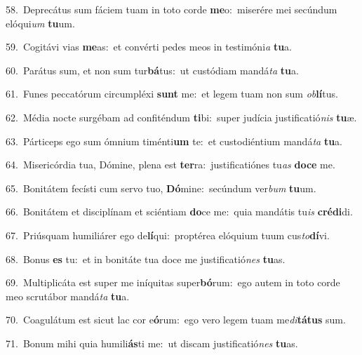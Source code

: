 {\numbfont\textcolor{\numbcolor}{58.}}~Deprecátus sum fáciem tuam in toto corde \textbf{me}\-o:~\star miserére mei secúndum elóqui\textit{um} \textbf{tu}\-um.\par
{\numbfont\textcolor{\numbcolor}{59.}}~Cogitávi vias \textbf{me}\-as:~\star et convérti pedes meos in testimóni\textit{a} \textbf{tu}\-a.\par
{\numbfont\textcolor{\numbcolor}{60.}}~Parátus sum, et non sum tur\-\textbf{bá}\-tus:~\star ut custódiam mandá\textit{ta} \textbf{tu}\-a.\par
{\numbfont\textcolor{\numbcolor}{61.}}~Funes peccatórum circumpléxi \textbf{sunt} me:~\star et legem tuam non sum \textit{ob}\-\textbf{lí}tus.\par
{\numbfont\textcolor{\numbcolor}{62.}}~Média nocte surgébam ad confiténdum \textbf{ti}\-bi:~\star super judícia justificatió\textit{nis} \textbf{tu}\-æ.\par
{\numbfont\textcolor{\numbcolor}{63.}}~Párticeps ego sum ómnium timénti\textbf{um} te:~\star et custodiéntium mandá\textit{ta} \textbf{tu}\-a.\par
{\numbfont\textcolor{\numbcolor}{64.}}~Misericórdia tua, Dómine, plena est \textbf{ter}\-ra:~\star justificatiónes tu\textit{as} \textbf{do}\-\textbf{ce} me.\par
{\numbfont\textcolor{\numbcolor}{65.}}~Bonitátem fecísti cum servo tuo, \textbf{Dó}\-mine:~\star secúndum ver\textit{bum} \textbf{tu}\-um.\par
{\numbfont\textcolor{\numbcolor}{66.}}~Bonitátem et disciplínam et sciéntiam \textbf{do}\-ce me:~\star quia mandátis tu\textit{is} \textbf{cré}\-\textbf{di}di.\par
{\numbfont\textcolor{\numbcolor}{67.}}~Priúsquam humiliárer ego de\-\textbf{lí}\-qui:~\star proptérea elóquium tuum cus\-\textit{to}\-\textbf{dí}vi.\par
{\numbfont\textcolor{\numbcolor}{68.}}~Bonus \textbf{es} tu:~\star et in bonitáte tua doce me justificatió\textit{nes} \textbf{tu}\-as.\par
{\numbfont\textcolor{\numbcolor}{69.}}~Multiplicáta est super me iníquitas super\-\textbf{bó}\-rum:~\star ego autem in toto corde meo scrutábor mandá\textit{ta} \textbf{tu}\-a.\par
{\numbfont\textcolor{\numbcolor}{70.}}~Coagulátum est sicut lac cor e\-\textbf{ó}\-rum:~\star ego vero legem tuam me\-\textit{di}\-\textbf{tá}\textbf{tus} sum.\par
{\numbfont\textcolor{\numbcolor}{71.}}~Bonum mihi quia humili\-\textbf{ás}\-ti me:~\star ut discam justificatió\textit{nes} \textbf{tu}\-as.\par
